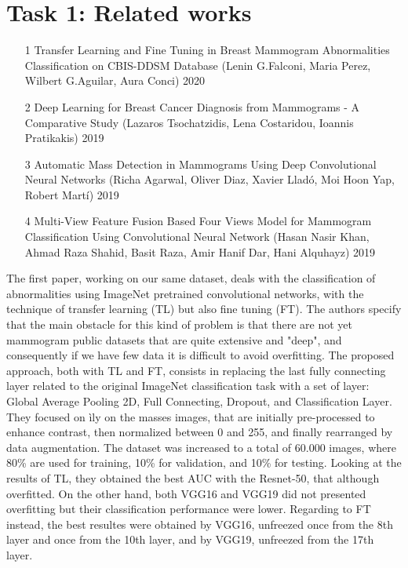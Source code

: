 \documentclass[11pt,a4paper,oneside]{article}
\begin{document}
\section{Task 1: Related works}
\begin{itemize}
\item [1] Transfer Learning and Fine Tuning in Breast Mammogram Abnormalities Classification on CBIS-DDSM Database (Lenin G.Falconi, Maria Perez, Wilbert G.Aguilar, Aura Conci) 2020
\item [2] Deep Learning for Breast Cancer Diagnosis from Mammograms - A Comparative Study (Lazaros Tsochatzidis, Lena Costaridou, Ioannis Pratikakis) 2019
\item [3] Automatic Mass Detection in Mammograms Using Deep Convolutional Neural Networks (Richa Agarwal, Oliver Diaz, Xavier Lladó, Moi Hoon Yap, Robert Martí) 2019
\item [4] Multi-View Feature Fusion Based Four Views Model for Mammogram Classification Using Convolutional Neural Network (Hasan Nasir Khan, Ahmad Raza Shahid, Basit Raza,
Amir Hanif Dar, Hani Alquhayz) 2019
\end{itemize}

The first paper, working on our same dataset, deals with the classification of abnormalities using ImageNet pretrained convolutional networks, with the technique of transfer learning (TL) but also fine tuning (FT). The authors specify that the main obstacle for this kind of problem is that there are not yet mammogram public datasets that are quite extensive and "deep", and consequently if we have few data it is difficult to avoid overfitting. The proposed approach, both with TL and FT, consists in replacing the last fully connecting layer related to the original ImageNet classification task with a set of layer: Global Average Pooling 2D, Full Connecting, Dropout, and Classification Layer. They focused on ìly on the masses images, that are initially pre-processed to enhance contrast, then normalized between 0 and 255, and finally rearranged by data augmentation. The dataset was increased to a total of 60.000 images, where 80\% are used for training, 10\% for validation, and 10\% for testing. Looking at the results of TL, they obtained the best AUC with the Resnet-50, that although overfitted. On the other hand, both VGG16 and VGG19 did not presented overfitting but their classification performance were lower. Regarding to FT instead, the best resultes were obtained by VGG16, unfreezed once from the 8th layer and once from the 10th layer, and by VGG19, unfreezed from the 17th layer.
\end{document}
